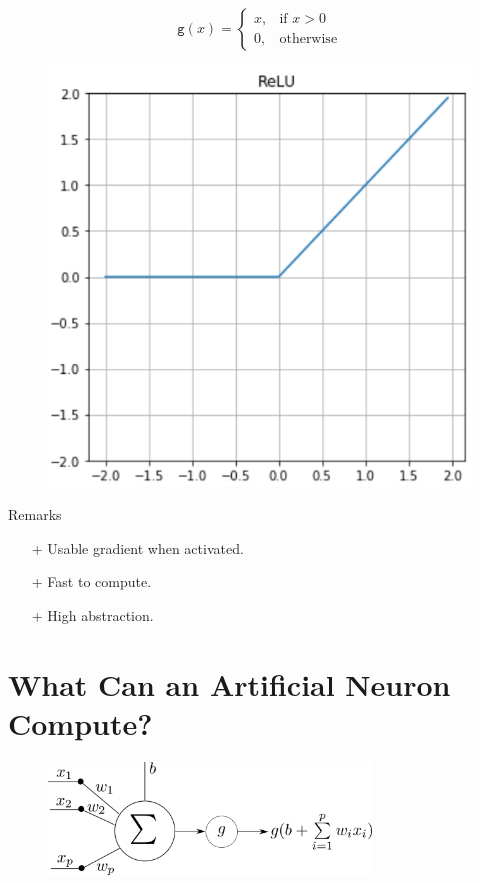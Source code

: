 \documentclass{book}
\newcommand{\act}{\texttt{g}}%
\begin{document}
\begin{figure}[h]
    \centering
    \begin{minipage}{.5\textwidth}
        \[
        \act(x)=
        \begin{cases}
        x, & \text{if } x > 0\\
        0, & \text{otherwise}
        \end{cases}
        \]
    \end{minipage}%
    \begin{minipage}{.5\textwidth}
        \centering
        \includegraphics[width=.8\textwidth]{act_relu.png}
    \end{minipage}
\end{figure}

\begin{myblock}{Remarks}
\begin{itemize}
\item[+] Usable gradient when activated.
\item[+] Fast to compute.
\item[+] High abstraction.
\end{itemize}
\end{myblock}

\section{What Can an Artificial Neuron Compute?}

\begin{figure}[h]
    \centering
    \includegraphics[height=3cm]{neurone}
\end{figure}
\end{document}
